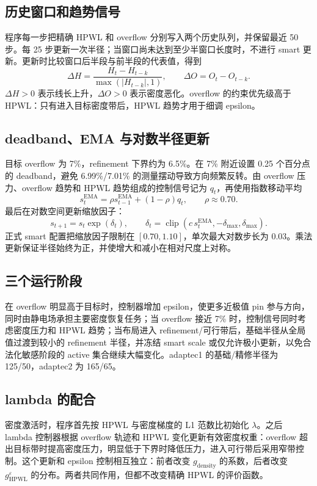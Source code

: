 \documentclass[11pt,a4paper]{ctexart}
\begin{document}
\subsection{历史窗口和趋势信号}
程序每一步把精确 HPWL 和 overflow 分别写入两个历史队列，并保留最近 50 步。每 25 步更新一次半径；当窗口尚未达到至少半窗口长度时，不进行 smart 更新。更新时比较窗口后半段与前半段的代表值，得到
\[
 \Delta H=\frac{H_t-H_{t-k}}{\max(|H_{t-k}|,1)},\qquad
 \Delta O=O_t-O_{t-k}.
\]
\(\Delta H>0\) 表示线长上升，\(\Delta O>0\) 表示密度恶化。overflow 的约束优先级高于 HPWL：只有进入目标密度带后，HPWL 趋势才用于细调 epsilon。

\subsection{deadband、EMA 与对数半径更新}
目标 overflow 为 7\%，refinement 下界约为 6.5\%。在 7\% 附近设置 0.25 个百分点的 deadband，避免 6.99\%/7.01\% 的测量摆动导致方向频繁反转。由 overflow 压力、overflow 趋势和 HPWL 趋势组成的控制信号记为 \(q_t\)，再使用指数移动平均
\[
 s^{\mathrm{EMA}}_t=\rho s^{\mathrm{EMA}}_{t-1}+(1-\rho)q_t,
 \qquad \rho\approx0.70.
\]
最后在对数空间更新缩放因子：
\[
 s_{t+1}=s_t\exp(\delta_t),\qquad
 \delta_t=\operatorname{clip}(c\,s^{\mathrm{EMA}}_t,-\delta_{\max},\delta_{\max}).
\]
正式 smart 配置把缩放因子限制在 \([0.70,1.10]\)，单次最大对数步长为 0.03。乘法更新保证半径始终为正，并使增大和减小在相对尺度上对称。

\subsection{三个运行阶段}
在 overflow 明显高于目标时，控制器增加 epsilon，使更多近极值 pin 参与方向，同时由静电场承担主要密度恢复任务；当 overflow 接近 7\% 时，控制信号同时考虑密度压力和 HPWL 趋势；当布局进入 refinement/可行带后，基础半径从全局值过渡到较小的 refinement 半径，并冻结 smart scale 或仅允许极小更新，以免合法化敏感阶段的 active 集合继续大幅变化。adaptec1 的基础/精修半径为 125/50，adaptec2 为 165/65。

\subsection{lambda 的配合}
密度激活时，程序首先按 HPWL 与密度梯度的 L1 范数比初始化 \(\lambda\)。之后 lambda 控制器根据 overflow 轨迹和 HPWL 变化更新有效密度权重：overflow 超出目标带时提高密度压力，明显低于下界时降低压力，进入可行带后采用窄带控制。这个更新和 epsilon 控制相互独立：前者改变 \(g_{\mathrm{density}}\) 的系数，后者改变 \(g_{\mathrm{HPWL}}^{\varepsilon}\) 的分布。两者共同作用，但都不改变精确 HPWL 的评价函数。
\end{document}
